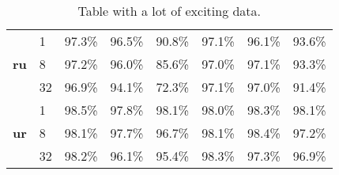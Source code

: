 \begin{table}[h]
\begin{tabular}{c l c c c|c c c}
        \cmidrule(lr){1-8}
        \multirow{3}{*}{\bfseries ru}
        &  1 & 97.3\% & 96.5\% & 90.8\% & 97.1\% & 96.1\% & 93.6\% \\
        &  8 & 97.2\% & 96.0\% & 85.6\% & 97.0\% & 97.1\% & 93.3\% \\
        & 32 & 96.9\% & 94.1\% & 72.3\% & 97.1\% & 97.0\% & 91.4\% \\

        \cmidrule(lr){1-8}
        \multirow{3}{*}{\bfseries ur}
        &  1 & 98.5\% & 97.8\% & 98.1\% & 98.0\% & 98.3\% & 98.1\% \\
        &  8 & 98.1\% & 97.7\% & 96.7\% & 98.1\% & 98.4\% & 97.2\% \\
        & 32 & 98.2\% & 96.1\% & 95.4\% & 98.3\% & 97.3\% & 96.9\% \\
        \bottomrule
    \end{tabular}
    \caption{Table with a lot of exciting data.
    }\label{table:acc-total-ner}
\end{table}



\pagebreak
